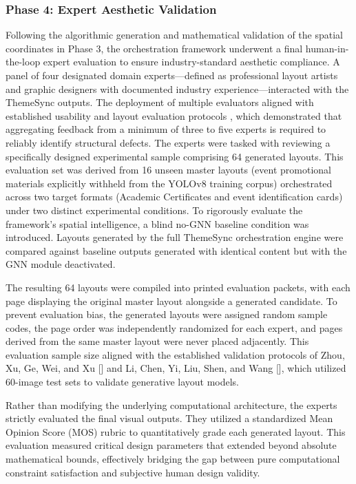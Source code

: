 \begin{refsection}
\subsubsection{Phase 4: Expert Aesthetic Validation}
Following the algorithmic generation and mathematical validation of the spatial coordinates in Phase 3, the orchestration framework underwent a final human-in-the-loop expert evaluation to ensure industry-standard aesthetic compliance. A panel of four designated domain experts—defined as professional layout artists and graphic designers with documented industry experience—interacted with the ThemeSync outputs. The deployment of multiple evaluators aligned with established usability and layout evaluation protocols \cite{nielsen1990heuristic, li2023radm, zhou2022cglgan}, which demonstrated that aggregating feedback from a minimum of three to five experts is required to reliably identify structural defects. The experts were tasked with reviewing a specifically designed experimental sample comprising 64 generated layouts. This evaluation set was derived from 16 unseen master layouts (event promotional materials explicitly withheld from the YOLOv8 training corpus) orchestrated across two target formats (Academic Certificates and event identification cards) under two distinct experimental conditions. To rigorously evaluate the framework's spatial intelligence, a blind no-GNN baseline condition was introduced. Layouts generated by the full ThemeSync orchestration engine were compared against baseline outputs generated with identical content but with the GNN module deactivated.

The resulting 64 layouts were compiled into printed evaluation packets, with each page displaying the original master layout alongside a generated candidate. To prevent evaluation bias, the generated layouts were assigned random sample codes, the page order was independently randomized for each expert, and pages derived from the same master layout were never placed adjacently. This evaluation sample size aligned with the established validation protocols of Zhou, Xu, Ge, Wei, and Xu [\citeyear{zhou2022cglgan}] and Li, Chen, Yi, Liu, Shen, and Wang [\citeyear{li2023radm}], which utilized 60-image test sets to validate generative layout models.

Rather than modifying the underlying computational architecture, the experts strictly evaluated the final visual outputs. They utilized a standardized Mean Opinion Score (MOS) rubric to quantitatively grade each generated layout. This evaluation measured critical design parameters that extended beyond absolute mathematical bounds, effectively bridging the gap between pure computational constraint satisfaction and subjective human design validity.


\end{refsection}
